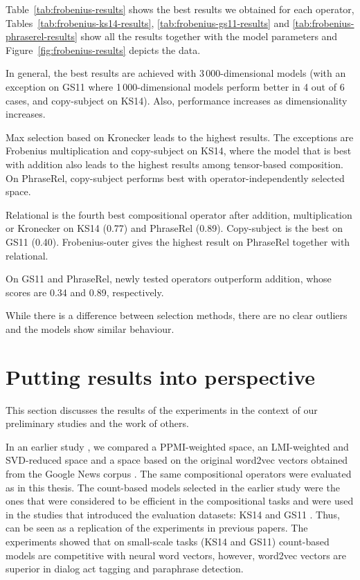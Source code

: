 

Table~\ref{tab:frobenius-results} shows the best results we obtained for each operator, Tables~\ref{tab:frobenius-ks14-results}, \ref{tab:frobenius-gs11-results} and \ref{tab:frobenius-phraserel-results} show all the results together with the model parameters and Figure~\ref{fig:frobenius-results} depicts the data.

In general, the best results are achieved with 3\,000-dimensional models (with an exception on GS11 where 1\,000-dimensional models perform better in 4 out of 6 cases, and copy-subject on KS14). Also, performance increases as dimensionality increases.

Max selection based on Kronecker leads to the highest results. The exceptions are Frobenius multiplication and copy-subject on KS14, where the model that is best with addition also leads to the highest results among tensor-based composition. On PhraseRel, copy-subject performs best with operator-independently selected space.

Relational is the fourth best compositional operator after addition, multiplication or Kronecker on KS14 (0.77) and PhraseRel (0.89). Copy-subject is the best on GS11 (0.40). Frobenius-outer gives the highest result on PhraseRel together with relational.

On GS11 and PhraseRel, newly tested operators outperform addition, whose scores are 0.34 and 0.89, respectively.

While there is a difference between selection methods, there are no clear outliers and the models show similar behaviour.

\section{Putting results into perspective}
\label{sec:comp-with-other}

This section discusses the results of the experiments in the context of our preliminary studies and the work of others.

In an earlier study \cite{milajevs-EtAl:2014:EMNLP2014}, we compared a PPMI-weighted space, an LMI-weighted and SVD-reduced space and a space based on the original word2vec vectors obtained from the Google News corpus \cite{mikolov2013distributed}. The same compositional operators were evaluated as in this thesis. The count-based models selected in the earlier study were the ones that were considered to be efficient in the compositional tasks and were used in the studies that introduced the evaluation datasets: KS14 \cite{kartsadrqpl2014} and GS11 \cite{Grefenstette:2011:ESC:2145432.2145580}. Thus,  can be seen as a replication of the experiments in previous papers. The experiments showed that on small-scale tasks (KS14 and GS11) count-based models are competitive with neural word vectors, however, word2vec vectors are superior in dialog act tagging and paraphrase detection.

